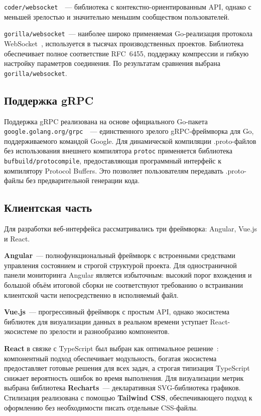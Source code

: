 \texttt{coder/websocket}~\cite{coderwebsocket}~--- библиотека с контекстно-ориентированным API,
однако с меньшей зрелостью и значительно меньшим сообществом пользователей.

\texttt{gorilla/websocket}~--- наиболее широко применяемая Go-реализация протокола
WebSocket~\cite{gorilla}, используется в тысячах производственных проектов.
Библиотека обеспечивает полное соответствие RFC~6455, поддержку компрессии
и гибкую настройку параметров соединения.
По результатам сравнения выбрана \texttt{gorilla/websocket}.

\subsection*{Поддержка gRPC}

Поддержка gRPC реализована на основе официального Go-пакета
\texttt{google.golang.org/grpc}~\cite{grpcgo}~---
единственного зрелого gRPC-фреймворка для Go, поддерживаемого командой Google.
Для динамической компиляции .proto-файлов без использования внешнего компилятора
\texttt{protoc} применяется библиотека \texttt{bufbuild/protocompile},
предоставляющая программный интерфейс к компилятору Protocol Buffers.
Это позволяет пользователям передавать .proto-файлы без предварительной генерации кода.

\subsection*{Клиентская часть}

Для разработки веб-интерфейса рассматривались три фреймворка: Angular, Vue.js и React.

\textbf{Angular}~--- полнофункциональный фреймворк с встроенными средствами управления
состоянием и строгой структурой проекта.
Для одностраничной панели мониторинга Angular является избыточным:
высокий порог вхождения и большой объём итоговой сборки не соответствуют
требованию о встраивании клиентской части непосредственно в исполняемый файл.

\textbf{Vue.js}~--- прогрессивный фреймворк с простым API, однако экосистема библиотек
для визуализации данных в реальном времени уступает React-экосистеме по зрелости
и разнообразию компонентов.

\textbf{React} в связке с TypeScript был выбран как оптимальное решение~\cite{react}:
компонентный подход обеспечивает модульность, богатая экосистема предоставляет
готовые решения для всех задач, а строгая типизация TypeScript снижает
вероятность ошибок во время выполнения.
Для визуализации метрик выбрана библиотека \textbf{Recharts}~---
декларативная SVG-библиотека графиков.
Стилизация реализована с помощью \textbf{Tailwind CSS}, обеспечивающего
подход к оформлению без необходимости писать отдельные CSS-файлы.

